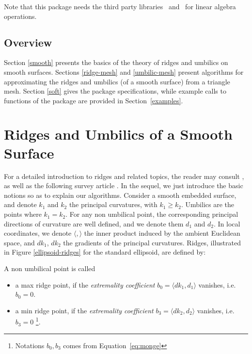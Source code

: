 Note that this package needs the third party libraries
\ccThirdPartyLapack\ and \ccThirdPartyBlas\ for linear algebra operations.

\subsection{Overview}

Section \ref{smooth} presents the basics of the theory of ridges and
umbilics on smooth surfaces. Sections \ref{ridge-mesh} and
\ref{umbilic-mesh} present algorithms for  approximating the ridges and
umbilics (of a smooth surface) from a triangle mesh. Section
\ref{soft} gives the package specifications, while example calls to
functions of the package are provided in Section~\ref{examples}.


\section{Ridges and Umbilics of a Smooth Surface\label{smooth}}

For a detailed introduction to ridges and related topics, the reader
may consult 
\cite{cgal:hgygm-ttdpf-99,cgal:p-gd-01}, as well as
the following survey article \cite{cgal:cp-ssulc-05}.
In the sequel, we just introduce the basic notions so as to explain
our algorithms.  Consider a smooth embedded surface, and denote $k_1$
and $k_2$ the principal curvatures, with $k_1\geq k_2$. Umbilics are
the points where $k_1=k_2$.  For any non umbilical point, the
corresponding principal directions of curvature are well defined, and
we denote them $d_1$ and $d_2$.
In local coordinates, we denote $\langle , \rangle$ the inner product
induced by the ambient Euclidean space, and $dk_1$, $dk_2$ the
gradients of the principal curvatures. Ridges, illustrated in Figure
\ref{ellipsoid-ridges} for the standard ellipsoid, are defined by:

\begin{definition}
\label{def:ridge-extrema}
A non umbilical point is called
\begin{itemize}
\item
a max ridge point, if the {\em extremality coefficient} $b_0=\langle
dk_1,d_1 \rangle$ vanishes, i.e. $b_0=0$.

\item a min ridge point, if the {\em extremality coefficient}
  $b_3=\langle dk_2,d_2 \rangle$ vanishes, i.e. $b_3=0$
  \footnote{Notations $b_0, b_3$ comes from Equation~\ref{eq:monge} }.
\end{itemize}
\end{definition}


